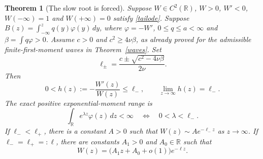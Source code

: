\documentclass[11pt]{article}
\newtheorem{theorem}{Theorem}
\newcommand{\R}{\mathbb R}
\begin{document}
\begin{theorem}[The slow root is forced]\label{slowroot}
Suppose $W\in C^2(\R)$, $W>0$, $W'<0$, $W(-\infty)=1$ and
$W(+\infty)=0$ satisfy \eqref{tailode}. Suppose
$B(z)=\int_{-\infty}^z q(y)\varphi(y)\,dy$, where
$\varphi=-W'$, $0\leq q\leq a<\infty$ and
$\beta=\int q\varphi>0$. Assume $c>0$ and
$c^2\geq4\nu\beta$, as already proved for the admissible
finite-first-moment waves in Theorem~\ref{waves}. Set
\[
 \ell_\pm=\frac{c\pm\sqrt{c^2-4\nu\beta}}{2\nu}.
\]
Then
\begin{equation}\label{hazardselected}
 0<h(z):=-\frac{W'(z)}{W(z)}\leq\ell_-,\qquad
          \lim_{z\to\infty}h(z)=\ell_-.
\end{equation}
The exact positive exponential-moment range is
\begin{equation}\label{momentcutoff}
 \int_\R e^{\lambda z}\varphi(z)\,dz<\infty
             \quad\Longleftrightarrow\quad 0<\lambda<\ell_-.
\end{equation}
If $\ell_-<\ell_+$, there is a constant $A>0$ such that
$W(z)\sim A e^{-\ell_-z}$ as $z\to\infty$.
If $\ell_- =\ell_+=:\ell$, there are constants $A_1>0$ and
$A_0\in\R$ such that
\[
 W(z)=\bigl(A_1z+A_0+o(1)\bigr)e^{-\ell z}.
\]
\end{theorem}
\end{document}
